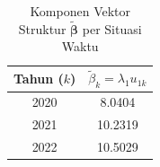 \begin{table}[H]
\centering
\small
\caption{Komponen Vektor Struktur $\tilde{\boldsymbol{\beta}}$ per Situasi Waktu} \label{tab:sample2beta_vec}
\begin{tabular}{|c|c|}
\hline
\textbf{Tahun ($k$)} & \textbf{$\tilde{\beta}_k = \lambda_1 u_{1k}$} \\
\hline
2020 & 8.0404 \\
2021 & 10.2319 \\
2022 & 10.5029 \\
\hline
\end{tabular}
\end{table}
